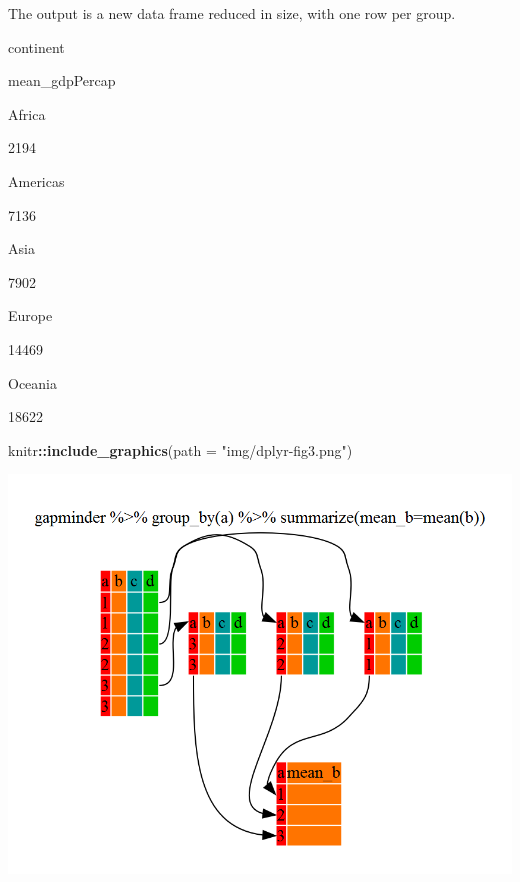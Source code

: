 \documentclass[]{book}
\newenvironment{Shaded}{\begin{snugshade}}{\end{snugshade}}
\newcommand{\KeywordTok}[1]{\textcolor[rgb]{0.13,0.29,0.53}{\textbf{#1}}}
\newcommand{\DataTypeTok}[1]{\textcolor[rgb]{0.13,0.29,0.53}{#1}}
\newcommand{\StringTok}[1]{\textcolor[rgb]{0.31,0.60,0.02}{#1}}
\newcommand{\OperatorTok}[1]{\textcolor[rgb]{0.81,0.36,0.00}{\textbf{#1}}}
\newcommand{\NormalTok}[1]{#1}
\begin{document}
The output is a new data frame reduced in size, with one row per group.

\begin{Shaded}
\end{Shaded}

continent

mean\_gdpPercap

Africa

2194

Americas

7136

Asia

7902

Europe

14469

Oceania

18622

\begin{Shaded}
\begin{Highlighting}[]
\NormalTok{knitr}\OperatorTok{::}\KeywordTok{include_graphics}\NormalTok{(}\DataTypeTok{path =} \StringTok{"img/dplyr-fig3.png"}\NormalTok{)}
\end{Highlighting}
\end{Shaded}

\begin{center}\includegraphics[width=0.7\linewidth]{img/dplyr-fig3} \end{center}
\end{document}

